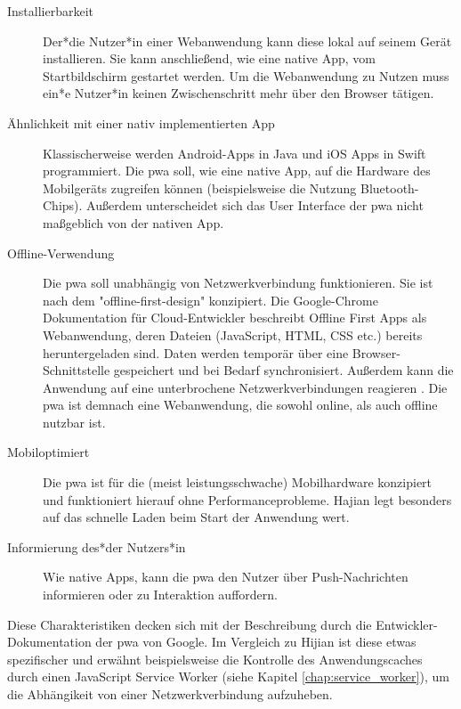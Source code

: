 \begin{description}
  \item [Installierbarkeit]
	  Der*die Nutzer*in einer Webanwendung kann diese lokal auf seinem Gerät installieren. Sie kann anschließend, wie eine native App, vom Startbildschirm gestartet werden. Um die Webanwendung zu Nutzen muss ein*e Nutzer*in keinen Zwischenschritt mehr über den Browser tätigen.
  
  \item [Ähnlichkeit mit einer nativ implementierten App]  
 	 Klassischerweise werden Android-Apps in Java und iOS Apps in Swift programmiert. Die \ac{pwa} soll, wie eine native App, auf die Hardware des Mobilgeräts zugreifen können (beispielsweise die Nutzung Bluetooth-Chips). Außerdem unterscheidet sich das User Interface der \ac{pwa} nicht maßgeblich von der nativen App. 
  
  \item [Offline-Verwendung] 
  	Die \ac{pwa} soll unabhängig von Netzwerkverbindung funktionieren. Sie ist nach dem "offline-first-design" konzipiert. Die Google-Chrome Dokumentation für Cloud-Entwickler beschreibt Offline First Apps als Webanwendung, deren Dateien (JavaScript, HTML, CSS etc.) bereits heruntergeladen sind. Daten werden temporär über eine Browser-Schnittstelle gespeichert und bei Bedarf synchronisiert. Außerdem kann die Anwendung auf eine unterbrochene Netzwerkverbindungen reagieren \cite{GoogleOfflineApps}. Die \ac{pwa} ist demnach eine Webanwendung, die sowohl online, als auch offline nutzbar ist.

  \item [Mobiloptimiert]  
  	Die \ac{pwa} ist für die (meist leistungsschwache) Mobilhardware konzipiert und funktioniert hierauf ohne Performanceprobleme. Hajian legt besonders auf das schnelle Laden beim Start der Anwendung wert.
  	
  \item [Informierung des*der Nutzers*in] 
  	Wie native Apps, kann die \ac{pwa} den Nutzer über Push-Nachrichten informieren oder zu Interaktion auffordern.
\end{description}

\cite[S. 1f.]{Hajian2019}
Diese Charakteristiken decken sich mit der Beschreibung durch die Entwickler-Dokumentation der \ac{pwa} von Google. Im Vergleich zu Hijian ist diese etwas spezifischer und erwähnt beispielsweise die Kontrolle des Anwendungscaches durch einen JavaScript Service Worker (siehe Kapitel \ref{chap:service_worker}), um die Abhängikeit von einer Netzwerkverbindung aufzuheben.
\cite{GooglePWAOverview}

